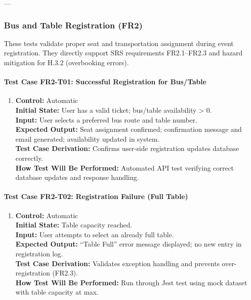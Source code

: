\documentclass[12pt, titlepage]{article}
\begin{document}
---

\subsubsection{Bus and Table Registration (FR2)}

These tests validate proper seat and transportation assignment during event registration. They directly support SRS requirements FR2.1–FR2.3 and hazard mitigation for H.3.2 (overbooking errors).

\paragraph{Test Case FR2-T01: Successful Registration for Bus/Table}

\begin{enumerate}
    \item \textbf{Control:} Automatic\\
    \textbf{Initial State:} User has a valid ticket; bus/table availability > 0.\\
    \textbf{Input:} User selects a preferred bus route and table number.\\
    \textbf{Expected Output:} Seat assignment confirmed; confirmation message and email generated; availability updated in system.\\
    \textbf{Test Case Derivation:} Confirms user-side registration updates database correctly.\\
    \textbf{How Test Will Be Performed:} Automated API test verifying correct database updates and response handling.
\end{enumerate}

\paragraph{Test Case FR2-T02: Registration Failure (Full Table)}

\begin{enumerate}
    \item \textbf{Control:} Automatic\\
    \textbf{Initial State:} Table capacity reached.\\
    \textbf{Input:} User attempts to select an already full table.\\
    \textbf{Expected Output:} “Table Full” error message displayed; no new entry in registration log.\\
    \textbf{Test Case Derivation:} Validates exception handling and prevents over-registration (FR2.3).\\
    \textbf{How Test Will Be Performed:} Run through Jest test using mock dataset with table capacity at max.
\end{enumerate}
\end{document}
